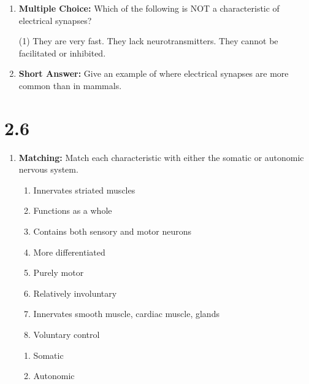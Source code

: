 \begin{enumerate}[label=\textbf{Q2.5.\arabic*}]
      \item \textbf{Multiple Choice:} Which of the following is NOT a characteristic of electrical synapses?
            \begin{tasks}[label=\textcolor{draculafg}{(\Alph*)}, item-format=\color{draculafg}, label-width=1.5em, item-indent=1.7em](1)
                  \task They are very fast.
                  \task They lack neurotransmitters.
                  \task They cannot be facilitated or inhibited.
                  \task {}
            \end{tasks}
            
      \item \textbf{Short Answer:} Give an example of where electrical synapses are more common than in mammals. \\
\end{enumerate}
\newpage
\squigglyline


\section*{2.6}

\begin{enumerate}[label=\textbf{Q2.6.\arabic*}]
      \item \textbf{Matching:} Match each characteristic with either the somatic or autonomic nervous system.
            \begin{wordbox}
                  \begin{enumerate}[label=(\alph*)]
                        \item Innervates striated muscles
                        \item Functions as a whole
                        \item Contains both sensory and motor neurons
                        \item More differentiated
                        \item Purely motor
                        \item Relatively involuntary
                        \item Innervates smooth muscle, cardiac muscle, glands
                        \item Voluntary control
                  \end{enumerate}
            \end{wordbox}
            \begin{enumerate}[label=(\arabic*)]
                  \item Somatic \quad \dotfill \quad {} \\
                  \item Autonomic \quad \dotfill \quad {}
            \end{enumerate}
\end{enumerate}
\squigglyline


